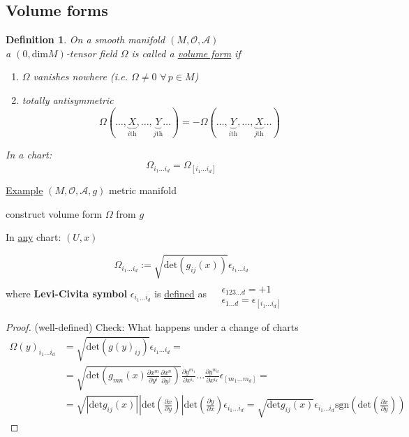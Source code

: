 \documentclass[10pt]{amsart}
\newtheorem{definition}{Definition}
\begin{document}
\begin{multicols*}{2}
	\subsection{}
	
	\subsection{Volume forms}
	
	\begin{definition}
		On a smooth manifold $(M,\mathcal{O},\mathcal{A})$ \\
		a $(0,\text{dim}M)$-tensor field $\Omega$ is called a \underline{volume form} if 
		\begin{enumerate}
			\item[(a)] $\Omega$ vanishes nowhere (i.e. $\Omega \neq 0 \, \, \forall \, p \in M$) 
			\item[(b)] totally antisymmetric 
			\[
			\Omega(\dots , \underbrace{X}_{i\text{th}} , \dots , \underbrace{Y}_{j\text{th}} \dots ) = - \Omega(\dots , \underbrace{Y}_{i\text{th}} , \dots , \underbrace{X}_{j\text{th}} \dots )
			\]
		\end{enumerate}
		
		In a chart: 
		\[
		\Omega_{i_1 \dots i_d} = \Omega_{ [i_1 \dots i_d ]}
		\]
	\end{definition}
	
	\underline{Example} $(M,\mathcal{O}, \mathcal{A},g)$ metric manifold
	
	construct volume form $\Omega$ from $g$
	
	In \underline{any} chart: $(U,x)$
	
	\[
	\Omega_{i_1 \dots i_d} := \sqrt{ \text{det}(g_{ij}(x)) } \epsilon_{i_1 \dots i_d} 
	\]
	where \textbf{Levi-Civita symbol} $\epsilon_{i_1 \dots i_d}$ is \underline{defined} as $\begin{aligned} & \quad \\ 
	& \epsilon_{123 \dots d} = +1 \\ 
	& \epsilon_{1\dots d} = \epsilon_{[i_1 \dots i_d]} \end{aligned}$
	
	\begin{proof} (well-defined) Check: What happens under a change of charts
		\[
		\begin{aligned}
		\Omega(y)_{i_1 \dots i_d} & = \sqrt{ \text{det}(g(y)_{ij}) } \epsilon_{i_1 \dots i_d} = \\
		& = \sqrt{ \text{det}(g_{mn}(x) \frac{ \partial x^m}{ \partial y^i} \frac{ \partial x^n}{ \partial y^j} )} \frac{ \partial y^{m_1} }{ \partial x^{i_1} } \dots \frac{ \partial y^{m_d}}{ \partial x^{i_d}} \epsilon_{ [m_1 \dots m_d] } = \\
		& = \sqrt{ | \text{det}g_{ij}(x) | } \left| \text{det}\left( \frac{ \partial x}{ \partial y} \right) \right| \text{det}\left( \frac{ \partial y}{ \partial x} \right) \epsilon_{i_1 \dots i_d} = \sqrt{ \text{det}g_{ij}(x)} \epsilon_{i_1 \dots i_d} \text{sgn}\left( \text{det}\left( \frac{ \partial x}{ \partial y} \right) \right)
		\end{aligned}
		\]
	\end{proof}
	

\end{multicols*}
\end{document}
